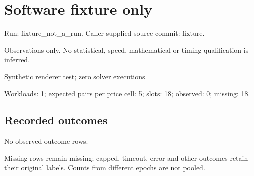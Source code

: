 \documentclass[10pt]{article}
\begin{document}
\raggedright\sloppy\section*{Software fixture only}
Run: fixture\_not\_a\_run. Caller-supplied source commit: fixture.\par
Observations only. No statistical, speed, mathematical or timing qualification is inferred.\par
Synthetic renderer test; zero solver executions\par Workloads: 1; expected pairs per price cell: 5; slots: 18; observed: 0; missing: 18.\par
\subsection*{Recorded outcomes}
No observed outcome rows.\par
 Missing rows remain missing; capped, timeout, error and other outcomes retain their original labels. Counts from different epochs are not pooled.\par
\end{document}
